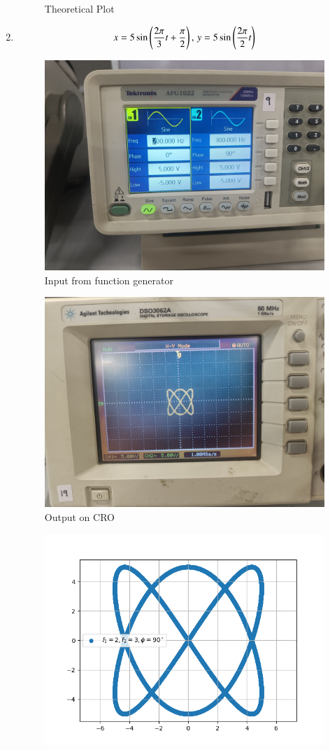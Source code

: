 \documentclass[journal]{IEEEtran}
\begin{document}
\begin{enumerate}
\begin{figure}[H]
        \caption{Theoretical Plot}
    \end{figure}
    \item \begin{align}
        x = 5\sin\left(\frac{2\pi}{3}t+\frac{\pi}{2}\right),\,y = 5\sin\left(\frac{2\pi}{2}t\right)
    \end{align}
    \begin{figure}[H]
        \centering
        \includegraphics[width=0.7\columnwidth]{pics/WhatsApp Image 2025-01-24 at 11.02.13(1).jpeg}
        \caption{Input from function generator}
    \end{figure}
    \begin{figure}[H]
        \centering
        \includegraphics[width=0.7\columnwidth]{pics/WhatsApp Image 2025-01-24 at 11.02.13.jpeg}
        \caption{Output on CRO}
    \end{figure}
    \begin{figure}[H]
        \centering
        \includegraphics[width=0.7\columnwidth]{figs/fig6.png}

\end{figure}
\end{enumerate}
\end{document}
